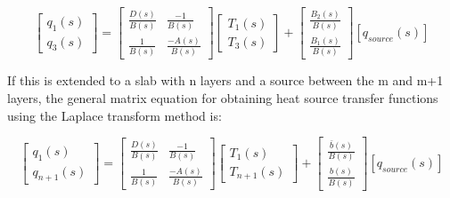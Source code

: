 \begin{equation}
\left[ {\begin{array}{ccc}{{q_1}\left( s \right)}\\ {{q_3}\left( s \right)}\end{array}} \right] = \left[ {\begin{array}{ccc}{\frac{{D\left( s \right)}}{{B\left( s \right)}}}&{\frac{{ - 1}}{{B\left( s \right)}}}\\ {\frac{1}{{B\left( s \right)}}}&{\frac{{ - A\left( s \right)}}{{B\left( s \right)}}}\end{array}} \right]\left[ {\begin{array}{ccc}{{T_1}\left( s \right)}\\ {{T_3}\left( s \right)}\end{array}} \right] + \left[ {\begin{array}{ccc}{\frac{{{B_2}\left( s \right)}}{{B\left( s \right)}}}\\ {\frac{{{B_1}\left( s \right)}}{{B\left( s \right)}}}\end{array}} \right]\left[ {{q_{source}}\left( s \right)} \right]
\end{equation}

If this is extended to a slab with n layers and a source between the m and m+1 layers, the general matrix equation for obtaining heat source transfer functions using the Laplace transform method is:

\begin{equation}
\left[ {\begin{array}{ccc}{{q_1}\left( s \right)}\\ {{q_{n + 1}}\left( s \right)}\end{array}} \right] = \left[ {\begin{array}{ccc}{\frac{{D\left( s \right)}}{{B\left( s \right)}}}&{\frac{{ - 1}}{{B\left( s \right)}}}\\ {\frac{1}{{B\left( s \right)}}}&{\frac{{ - A\left( s \right)}}{{B\left( s \right)}}}\end{array}} \right]\left[ {\begin{array}{ccc}{{T_1}\left( s \right)}\\ {{T_{n + 1}}\left( s \right)}\end{array}} \right] + \left[ {\begin{array}{ccc}{\frac{{\bar b\left( s \right)}}{{B\left( s \right)}}}\\ {\frac{{b\left( s \right)}}{{B\left( s \right)}}}\end{array}} \right]\left[ {{q_{source}}\left( s \right)} \right]
\label{eq:LaplaceTransformDeriv652}
\end{equation}

